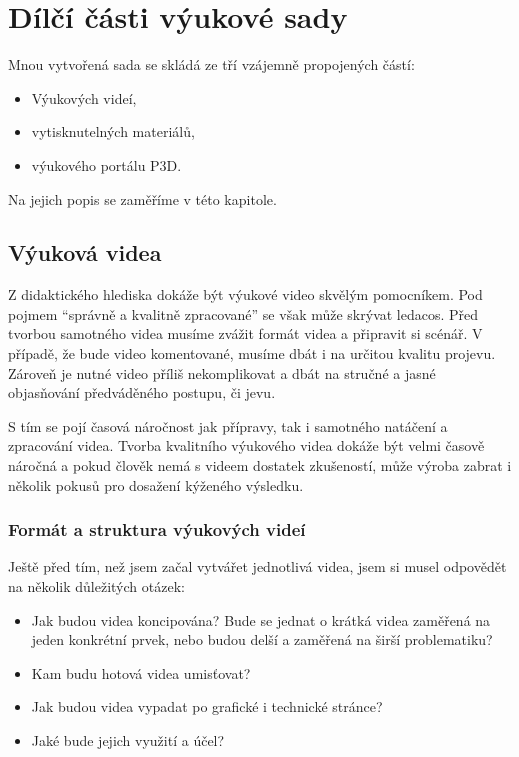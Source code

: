 \chapter{Dílčí části výukové sady}
Mnou vytvořená sada se skládá ze tří vzájemně propojených částí:
\begin{itemize}[topsep=0pt]
    \setlength\itemsep{0em}
    \item Výukových videí,
    \item vytisknutelných materiálů,
    \item výukového portálu P3D.
\end{itemize}
Na jejich popis se zaměříme v této kapitole.

\section{Výuková videa}
Z didaktického hlediska dokáže být  výukové video skvělým pomocníkem.
Pod pojmem \enquote{správně a kvalitně zpracované} se však může skrývat ledacos.
Před tvorbou samotného videa musíme zvážit formát videa a připravit si scénář.
V případě, že bude video komentované, musíme dbát i na určitou kvalitu projevu.
Zároveň je nutné video příliš nekomplikovat a dbát na stručné a jasné objasňování předváděného postupu, či jevu.

S tím se pojí časová náročnost jak přípravy, tak i samotného natáčení a zpracování videa.
Tvorba kvalitního výukového videa dokáže být velmi časově náročná a pokud člověk nemá s videem dostatek zkušeností, může výroba zabrat i několik pokusů pro dosažení kýženého výsledku.

\subsection{Formát a struktura výukových videí}
Ještě před tím, než jsem začal vytvářet jednotlivá videa, jsem si musel odpovědět na několik důležitých otázek:
\begin{itemize}[topsep=0pt]
    \setlength\itemsep{0em}
    \item Jak budou videa koncipována? Bude se jednat o krátká videa zaměřená na jeden konkrétní prvek, nebo budou delší a zaměřená na širší problematiku?
    \item Kam budu hotová videa umisťovat?
    \item Jak budou videa vypadat po grafické i technické stránce?
    \item Jaké bude jejich využití a účel?
\end{itemize}

